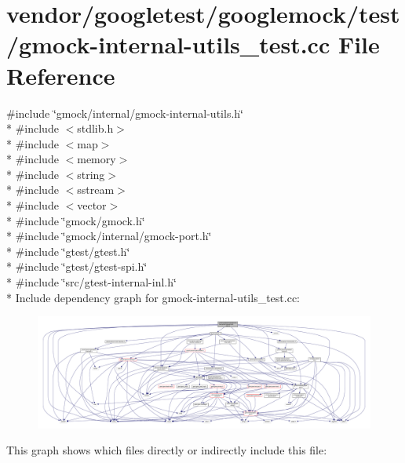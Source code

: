 \hypertarget{gmock-internal-utils__test_8cc}{}\section{vendor/googletest/googlemock/test/gmock-\/internal-\/utils\+\_\+test.cc File Reference}
\label{gmock-internal-utils__test_8cc}
{\ttfamily \#include \char`\"{}gmock/internal/gmock-\/internal-\/utils.\+h\char`\"{}}\\*
{\ttfamily \#include $<$stdlib.\+h$>$}\\*
{\ttfamily \#include $<$map$>$}\\*
{\ttfamily \#include $<$memory$>$}\\*
{\ttfamily \#include $<$string$>$}\\*
{\ttfamily \#include $<$sstream$>$}\\*
{\ttfamily \#include $<$vector$>$}\\*
{\ttfamily \#include \char`\"{}gmock/gmock.\+h\char`\"{}}\\*
{\ttfamily \#include \char`\"{}gmock/internal/gmock-\/port.\+h\char`\"{}}\\*
{\ttfamily \#include \char`\"{}gtest/gtest.\+h\char`\"{}}\\*
{\ttfamily \#include \char`\"{}gtest/gtest-\/spi.\+h\char`\"{}}\\*
{\ttfamily \#include \char`\"{}src/gtest-\/internal-\/inl.\+h\char`\"{}}\\*
Include dependency graph for gmock-\/internal-\/utils\+\_\+test.cc\+:
\nopagebreak
\begin{figure}[H]
\begin{center}
\leavevmode
\includegraphics[width=350pt]{gmock-internal-utils__test_8cc__incl}
\end{center}
\end{figure}
This graph shows which files directly or indirectly include this file\+:
\nopagebreak
